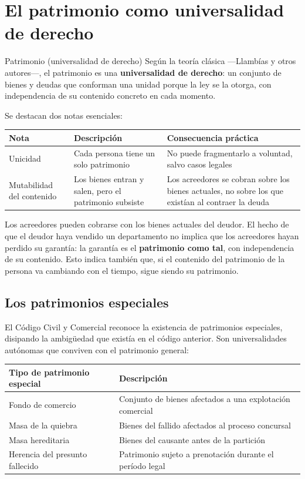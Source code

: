 \documentclass[12pt,oneside]{book}
\newenvironment{tabla}{%
    \par\medskip\begingroup\small\renewcommand{\arraystretch}{1.3}\noindent\ignorespaces
}{%
    \par\endgroup\medskip
}
\begin{document}
\section{El patrimonio como universalidad de derecho}

\begin{definition}{Patrimonio (universalidad de derecho)}
Según la teoría clásica ---Llambías y otros autores---, el patrimonio es una \textbf{universalidad de derecho}: un conjunto de bienes y deudas que conforman una unidad porque la ley se la otorga, con independencia de su contenido concreto en cada momento.
\end{definition}

Se destacan dos notas esenciales:

\begin{tabla}
\begin{tabularx}{\textwidth}{B{3.0cm}YY}
\toprule
Nota & \textbf{Descripción} & \textbf{Consecuencia práctica} \\
\midrule
Unicidad & Cada persona tiene un solo patrimonio & No puede fragmentarlo a voluntad, salvo casos legales \\
Mutabilidad del contenido & Los bienes entran y salen, pero el patrimonio subsiste & Los acreedores se cobran sobre los bienes actuales, no sobre los que existían al contraer la deuda \\
\bottomrule
\end{tabularx}
\end{tabla}

Los acreedores pueden cobrarse con los bienes actuales del deudor. El hecho de que el deudor haya vendido un departamento no implica que los acreedores hayan perdido su garantía: la garantía es el \textbf{patrimonio como tal}, con independencia de su contenido. Esto indica también que, si el contenido del patrimonio de la persona va cambiando con el tiempo, sigue siendo su patrimonio.

\subsection{Los patrimonios especiales}

El Código Civil y Comercial reconoce la existencia de patrimonios especiales, disipando la ambigüedad que existía en el código anterior. Son universalidades autónomas que conviven con el patrimonio general:

\begin{tabla}
\begin{tabularx}{\textwidth}{B{4.6cm}Y}
\toprule
Tipo de patrimonio especial & \textbf{Descripción} \\
\midrule
Fondo de comercio & Conjunto de bienes afectados a una explotación comercial \\
Masa de la quiebra & Bienes del fallido afectados al proceso concursal \\
Masa hereditaria & Bienes del causante antes de la partición \\
Herencia del presunto fallecido & Patrimonio sujeto a prenotación durante el período legal \\
\bottomrule
\end{tabularx}
\end{tabla}
\end{document}
